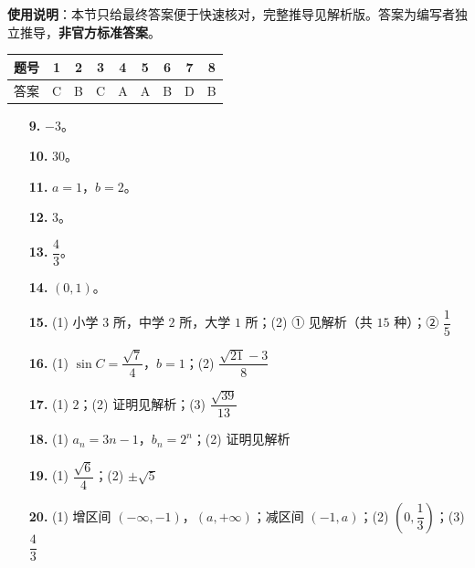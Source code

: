 
\begin{gknotice}
\textbf{使用说明}：本节只给最终答案便于快速核对，完整推导见解析版。答案为编写者独立推导，\textbf{非官方标准答案}。
\end{gknotice}

\begin{center}\begin{tabular}{ccccccccc}
\toprule
题号 & 1 & 2 & 3 & 4 & 5 & 6 & 7 & 8 \\
\midrule
答案 & C & B & C & A & A & B & D & B \\
\bottomrule
\end{tabular}\end{center}

\begin{itemize}[leftmargin=2.6em]
  \item[\textbf{9.}] $-3$。
  \item[\textbf{10.}] $30$。
  \item[\textbf{11.}] $a=1$，$b=2$。
  \item[\textbf{12.}] $3$。
  \item[\textbf{13.}] $\dfrac43$。
  \item[\textbf{14.}] $(0,1)$。
\end{itemize}

\begin{itemize}[leftmargin=2.6em]
  \item[\textbf{15.}] (1) 小学 $3$ 所，中学 $2$ 所，大学 $1$ 所；(2) ① 见解析（共 $15$ 种）；② $\dfrac15$
  \item[\textbf{16.}] (1) $\sin C=\dfrac{\sqrt7}4$，$b=1$；(2) $\dfrac{\sqrt{21}-3}8$
  \item[\textbf{17.}] (1) $2$；(2) 证明见解析；(3) $\dfrac{\sqrt{39}}{13}$
  \item[\textbf{18.}] (1) $a_n=3n-1$，$b_n=2^n$；(2) 证明见解析
  \item[\textbf{19.}] (1) $\dfrac{\sqrt6}4$；(2) $\pm\sqrt5$
  \item[\textbf{20.}] (1) 增区间 $(-\infty,-1)$，$(a,+\infty)$；减区间 $(-1,a)$；(2) $\left(0,\dfrac13\right)$；(3) $\dfrac43$
\end{itemize}
